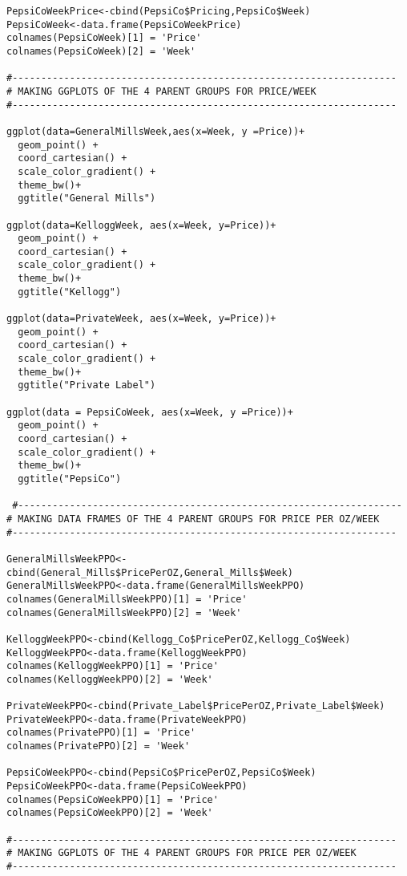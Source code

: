 \documentclass[12pt,english]{article}
\begin{document}
\begin{lstlisting}
PepsiCoWeekPrice<-cbind(PepsiCo$Pricing,PepsiCo$Week)
PepsiCoWeek<-data.frame(PepsiCoWeekPrice)
colnames(PepsiCoWeek)[1] = 'Price'
colnames(PepsiCoWeek)[2] = 'Week'

#-------------------------------------------------------------------
# MAKING GGPLOTS OF THE 4 PARENT GROUPS FOR PRICE/WEEK
#-------------------------------------------------------------------

ggplot(data=GeneralMillsWeek,aes(x=Week, y =Price))+
  geom_point() +
  coord_cartesian() +
  scale_color_gradient() +
  theme_bw()+
  ggtitle("General Mills")

ggplot(data=KelloggWeek, aes(x=Week, y=Price))+
  geom_point() +
  coord_cartesian() +
  scale_color_gradient() +
  theme_bw()+
  ggtitle("Kellogg")

ggplot(data=PrivateWeek, aes(x=Week, y=Price))+
  geom_point() +
  coord_cartesian() +
  scale_color_gradient() +
  theme_bw()+
  ggtitle("Private Label")

ggplot(data = PepsiCoWeek, aes(x=Week, y =Price))+
  geom_point() +
  coord_cartesian() +
  scale_color_gradient() +
  theme_bw()+
  ggtitle("PepsiCo")
  
 #-------------------------------------------------------------------
# MAKING DATA FRAMES OF THE 4 PARENT GROUPS FOR PRICE PER OZ/WEEK
#-------------------------------------------------------------------

GeneralMillsWeekPPO<-cbind(General_Mills$PricePerOZ,General_Mills$Week)
GeneralMillsWeekPPO<-data.frame(GeneralMillsWeekPPO)
colnames(GeneralMillsWeekPPO)[1] = 'Price'
colnames(GeneralMillsWeekPPO)[2] = 'Week'

KelloggWeekPPO<-cbind(Kellogg_Co$PricePerOZ,Kellogg_Co$Week)
KelloggWeekPPO<-data.frame(KelloggWeekPPO)
colnames(KelloggWeekPPO)[1] = 'Price'
colnames(KelloggWeekPPO)[2] = 'Week'

PrivateWeekPPO<-cbind(Private_Label$PricePerOZ,Private_Label$Week)
PrivateWeekPPO<-data.frame(PrivateWeekPPO)
colnames(PrivatePPO)[1] = 'Price'
colnames(PrivatePPO)[2] = 'Week'

PepsiCoWeekPPO<-cbind(PepsiCo$PricePerOZ,PepsiCo$Week)
PepsiCoWeekPPO<-data.frame(PepsiCoWeekPPO)
colnames(PepsiCoWeekPPO)[1] = 'Price'
colnames(PepsiCoWeekPPO)[2] = 'Week'

#-------------------------------------------------------------------
# MAKING GGPLOTS OF THE 4 PARENT GROUPS FOR PRICE PER OZ/WEEK
#-------------------------------------------------------------------


\end{lstlisting}
\end{document}

